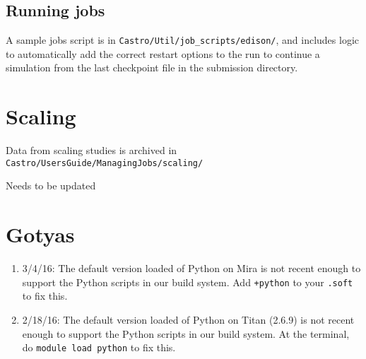 \subsection{Running jobs}

A sample jobs script is in {\tt Castro/Util/job\_scripts/edison/}, and 
includes logic to automatically add the correct restart options to the 
run to continue a simulation from the last checkpoint file in the 
submission directory.



\section{Scaling}

Data from scaling studies is archived in {\tt Castro/UsersGuide/ManagingJobs/scaling/}

Needs to be updated



\section{Gotyas}

\begin{enumerate}

\item 3/4/16: The default version loaded of Python on Mira is not
  recent enough to support the Python scripts in our build system. Add
  {\tt +python} to your {\tt .soft} to fix this.

\item 2/18/16: The default version loaded of Python on Titan (2.6.9)
  is not recent enough to support the Python scripts in our build
  system. At the terminal, do {\tt module load python} to fix this.


\end{enumerate}

